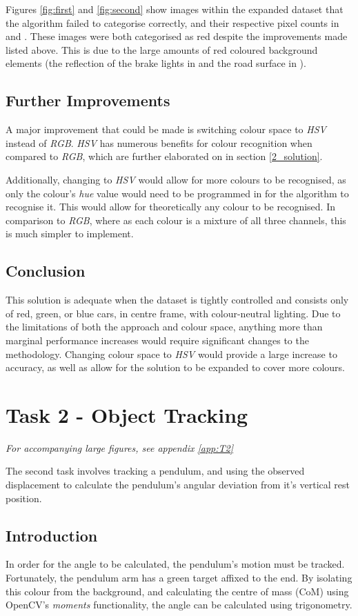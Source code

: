 \documentclass[conference]{IEEEtran}
\begin{document}
Figures \ref{fig:first} and \ref{fig:second} show images within the expanded dataset that the algorithm failed to categorise correctly, and their respective pixel counts in  and . These images were both categorised as red despite the improvements made listed above. This is due to the large amounts of red coloured background elements (the reflection of the brake lights in  and the road surface in ).


\subsection{Further Improvements} \label{sec:further1}
A major improvement that could be made is switching colour space to \textit{HSV} instead of \textit{RGB}. \textit{HSV} has numerous benefits for colour recognition when compared to \textit{RGB}, which are further elaborated on in section \ref{2_solution}.

Additionally, changing to \textit{HSV} would allow for more colours to be recognised, as only the colour's \textit{hue} value would need to be programmed in for the algorithm to recognise it. This would allow for theoretically any colour to be recognised. In comparison to \textit{RGB}, where as each colour is a mixture of all three channels, this is much simpler to implement.
\subsection{Conclusion}
This solution is adequate when the dataset is tightly controlled and consists only of red, green, or blue cars, in centre frame, with colour-neutral lighting. Due to the limitations of both the approach and colour space, anything more than marginal performance increases would require significant changes to the methodology. Changing colour space to \textit{HSV} would provide a large increase to accuracy, as well as allow for the solution to be expanded to cover more colours.

\section{Task 2 - Object Tracking}
\textit{For accompanying large figures, see appendix \ref{app:T2}}

The second task involves tracking a pendulum, and using the observed displacement to calculate the pendulum's angular deviation from it's vertical rest position.
\subsection{Introduction}
In order for the angle to be calculated, the pendulum's motion must be tracked. Fortunately, the pendulum arm has a green target affixed to the end. By isolating this colour from the background, and calculating the centre of mass (CoM) using OpenCV's \textit{moments} functionality, the angle can be calculated using trigonometry.
\end{document}

